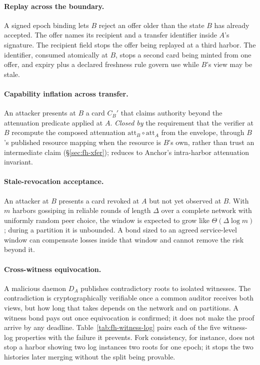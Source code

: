 \documentclass[11pt,a4paper]{article}
\theoremstyle{definition}
\theoremstyle{remark}
\begin{document}
\paragraph{Replay across the boundary.}
A signed epoch binding lets $B$ reject an offer older than the state $B$
has already accepted. The offer names its recipient and a transfer
identifier inside $A$'s signature. The recipient field stops the offer being
replayed at a third harbor. The identifier, consumed atomically at $B$,
stops a second card being minted from one offer, and expiry plus a declared
freshness rule govern use while $B$'s view may be stale.

\paragraph{Capability inflation across transfer.} An attacker presents at $B$ a card $C_B'$ that claims authority beyond the attenuation predicate applied at $A$. \emph{Closed by} the requirement that the verifier at $B$ recompute the composed attenuation $\mathrm{att}_B \circ \mathrm{att}_A$ from the envelope, through $B$'s published resource mapping when the resource is $B$'s own, rather than trust an intermediate claim (\S\ref{sec:fh-xfer}); reduces to Anchor's intra-harbor attenuation invariant.

\paragraph{Stale-revocation acceptance.} An attacker at $B$ presents a card revoked at $A$ but not yet observed at $B$. With $m$ harbors gossiping in reliable rounds of length $\Delta$ over a complete network with uniformly random peer choice, the window is expected to grow like $\Theta(\Delta\log m)$; during a partition it is unbounded. A bond sized to an agreed service-level window can compensate losses inside that window and cannot remove the risk beyond it.

\paragraph{Cross-witness equivocation.} A malicious daemon $D_A$ publishes contradictory roots to isolated witnesses. The contradiction is cryptographically verifiable once a common auditor receives both views, but how long that takes depends on the network and on partitions. A witness bond pays out once equivocation is confirmed; it does not make the proof arrive by any deadline.
Table~\ref{tab:fh-witness-log} pairs each of the five witness-log properties with the failure it prevents. Fork consistency, for instance, does not stop a harbor showing two log instances two roots for one epoch; it stops the two histories later merging without the split being provable.
\end{document}
